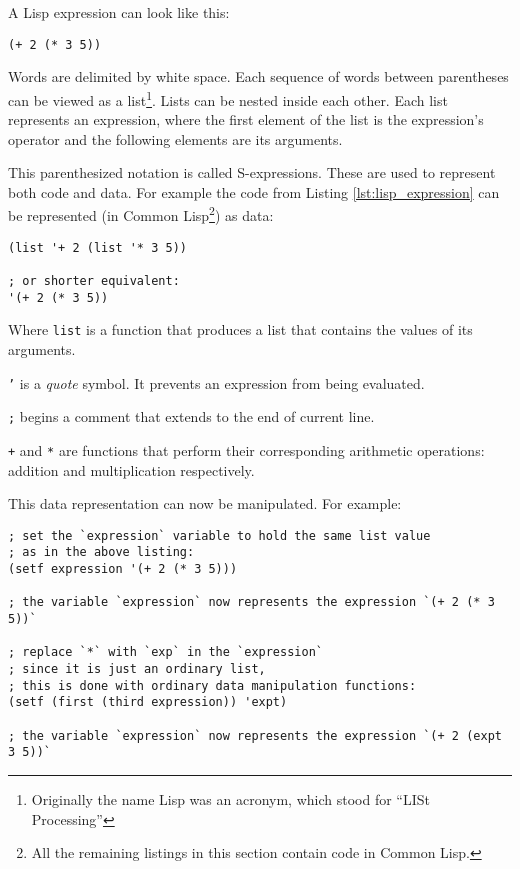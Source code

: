 A Lisp expression can look like this:
\begin{lstlisting}[label={lst:lisp_expression}]
(+ 2 (* 3 5))
\end{lstlisting}

Words are delimited by white space. Each sequence of words between parentheses can be viewed as a list\footnote{Originally the name Lisp was an acronym, which stood for ``LISt Processing''\cite[Section~1.2]{emacs_lisp_reference}\cite[Chapter~12]{practical_lisp}}. Lists can be nested inside each other. Each list represents an expression, where the first element of the list is the expression's operator and the following elements are its arguments.

This parenthesized notation is called S-expressions\cite[Section~Recursive Functions of Symbolic Expressions; Section~The LISP Programming System]{s_expressions}. These are used to represent both code and data. For example the code from Listing \ref{lst:lisp_expression} can be represented (in Common Lisp\footnote{All the remaining listings in this section contain code in Common Lisp.}) as data:
\begin{lstlisting}
(list '+ 2 (list '* 3 5))

; or shorter equivalent:
'(+ 2 (* 3 5))
\end{lstlisting}

Where \texttt{list} is a function that produces a list that contains the values of its arguments.

\texttt{'} is a \textit{quote} symbol. It prevents an expression from being evaluated.

\texttt{;} begins a comment that extends to the end of current line.

\texttt{+} and \texttt{*} are functions that perform their corresponding arithmetic operations: addition and multiplication respectively.

This data representation can now be manipulated. For example:
\begin{lstlisting}
; set the `expression` variable to hold the same list value
; as in the above listing:
(setf expression '(+ 2 (* 3 5)))

; the variable `expression` now represents the expression `(+ 2 (* 3 5))`

; replace `*` with `exp` in the `expression`
; since it is just an ordinary list,
; this is done with ordinary data manipulation functions:
(setf (first (third expression)) 'expt)

; the variable `expression` now represents the expression `(+ 2 (expt 3 5))`
\end{lstlisting}

